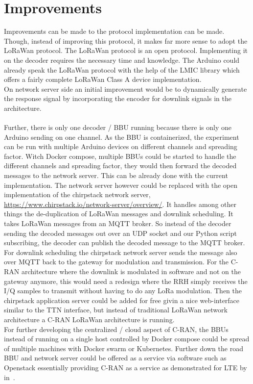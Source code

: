 \section{Improvements}
Improvements can be made to the protocol implementation can be made. Though, instead
of improving this protocol, it makes far more sense to adopt the LoRaWan protocol.
The LoRaWan protocol is an open protocol. Implementing it on the decoder requires the 
necessary time and knowledge. The Arduino could already speak the LoRaWan protocol with 
the help of the LMIC library which offers a fairly complete LoRaWan Class A device implementation.
\\
On network server side an initial improvement would be to dynamically generate the response signal
by incorporating the encoder for downlink signals in the architecture.\\
\\
Further, there is only one decoder / BBU running because there is only one Arduino sending on one channel.
As the BBU is containerized, the experiment can be run with multiple Arduino devices on different 
channels and spreading factor. Witch Docker compose, multiple BBUs could be started to handle the different 
channels and spreading factor, they would then forward the decoded messages to the network server.
This can be already done with the current implementation. The network server however could be replaced 
with the open implementation of the chirpstack network server, \url{https://www.chirpstack.io/network-server/overview/}. 
It handles among other things the de-duplication of LoRaWan messages and downlink scheduling.
It takes LoRaWan messages from an MQTT broker. So instead of the decoder sending the decoded messages 
out over an UDP socket and our Python script subscribing, the decoder can publish the decoded message to the 
MQTT broker. For downlink scheduling the chirpstack network server sends the message also over MQTT
back to the gateway for modulation and transmission. For the C-RAN architecture where the downlink is modulated 
in software and not on the gateway anymore, this would need a redesign where the RRH simply receives the I/Q samples
to transmit without having to do any LoRa modulation. Then the chirpstack application server could be 
added for free givin a nice web-interface similar to the TTN interface, but instead of 
traditional LoRaWan network architecture a C-RAN LoRaWan architecture is running.
\\
For further developing the centralized / cloud aspect of C-RAN, the BBUs instead of running on a single host
controlled by Docker compose could be spread of multiple machines with Docker swarm or Kubernetes. 
Further down the road BBU and network server could be offered as a service via software such as Openstack 
essentially providing C-RAN as a service as demonstrated for LTE by in~\cite{Nikaein2015}.


